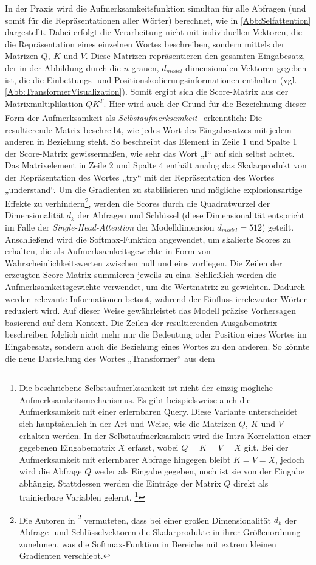In der Praxis wird die Aufmerksamkeitsfunktion simultan für alle Abfragen (und somit für die Repräsentationen aller Wörter) berechnet, wie in \cref{Abb:Selfattention} dargestellt. Dabei erfolgt die Verarbeitung nicht mit individuellen Vektoren, die die Repräsentation eines einzelnen Wortes beschreiben, sondern mittels der Matrizen $Q,\ K$ und $V$. Diese Matrizen repräsentieren den gesamten Eingabesatz, der in der Abbildung durch die $n$ grauen, $d_{model}$-dimensionalen Vektoren gegeben ist, die die Einbettungs- und Positionskodierungsinformationen enthalten (vgl. \cref{Abb:TransformerVisualization}). Somit ergibt sich die Score-Matrix aus der Matrixmultiplikation $QK^T$. Hier wird auch der Grund für die Bezeichnung dieser Form der Aufmerksamkeit als \emph{Selbstaufmerksamkeit}\footnote{Die beschriebene Selbstaufmerksamkeit ist nicht der einzig mögliche Aufmerksamkeitsmechanismus. Es gibt beispielsweise auch die Aufmerksamkeit mit einer erlernbaren Query. Diese Variante unterscheidet sich hauptsächlich in der Art und Weise, wie die Matrizen $Q,\ K$ und $V$ erhalten werden. In der Selbstaufmerksamkeit wird die Intra-Korrelation einer gegebenen Eingabematrix $X$ erfasst, wobei $Q=K=V=X$ gilt. Bei der Aufmerksamkeit mit erlernbarer Abfrage hingegen bleibt $K=V=X$, jedoch wird die Abfrage $Q$ weder als Eingabe gegeben, noch ist sie von der Eingabe abhängig. Stattdessen werden die Einträge der Matrix $Q$ direkt als trainierbare Variablen gelernt. \footcite{Mathematical_view_of_attention_models_in_deep_learning}} erkenntlich: Die resultierende Matrix beschreibt, wie jedes Wort des Eingabesatzes mit jedem anderen in Beziehung steht. So beschreibt das Element in Zeile 1 und Spalte 1 der Score-Matrix gewissermaßen, wie sehr das Wort „I“ auf sich selbst achtet. Das Matrixelement in Zeile 2 und Spalte 4 enthält analog das Skalarprodukt von der Repräsentation des Wortes „try“ mit der Repräsentation des Wortes „understand“. Um die Gradienten zu stabilisieren und mögliche explosionsartige Effekte zu verhindern\footnote{Die Autoren in \footcite{Attention_is_all_you_need} vermuteten, dass bei einer großen Dimensionalität $d_k$ der Abfrage- und Schlüsselvektoren die Skalarprodukte in ihrer Größenordnung zunehmen, was die Softmax-Funktion in Bereiche mit extrem kleinen Gradienten verschiebt.}, werden die Scores durch die Quadratwurzel der Dimensionalität $d_k$ der Abfragen und Schlüssel (diese Dimensionalität entspricht im Falle der \emph{Single-Head-Attention} der Modelldimension $d_{model}=512$) geteilt. Anschließend wird die Softmax-Funktion angewendet, um skalierte Scores zu erhalten, die als Aufmerksamkeitsgewichte in Form von Wahrscheinlichkeitswerten zwischen null und eins vorliegen. Die Zeilen der erzeugten Score-Matrix summieren jeweils zu eins. Schließlich werden die Aufmerksamkeitsgewichte verwendet, um die Wertmatrix zu gewichten. Dadurch werden relevante Informationen betont, während der Einfluss irrelevanter Wörter reduziert wird. Auf dieser Weise gewährleistet das Modell präzise Vorhersagen basierend auf dem Kontext. Die Zeilen der resultierenden Ausgabematrix beschreiben folglich nicht mehr nur die Bedeutung oder Position eines Wortes im Eingabesatz, sondern auch die Beziehung eines Wortes zu den anderen. So könnte die neue Darstellung des Wortes „Transformer“ aus dem 